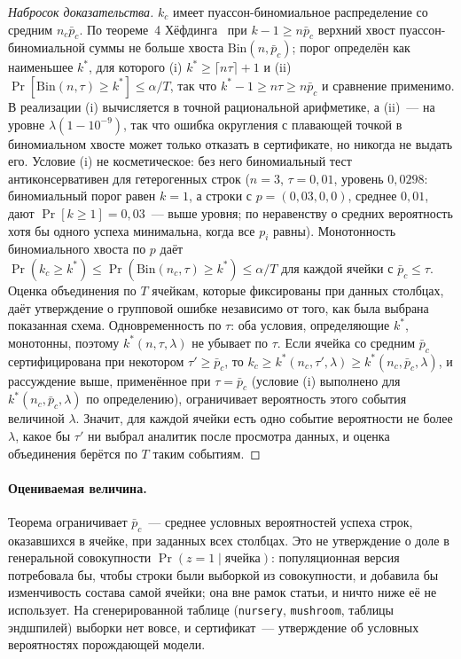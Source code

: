 \documentclass[11pt]{article}
\begin{document}
\begin{proof}[Набросок доказательства]
$k_c$ имеет пуассон-биномиальное распределение со средним $n_c\bar p_c$. По теореме~4 Хёфдинга~\citep{hoeffding1956} при $k-1\ge n\bar p_c$ верхний хвост пуассон-биномиальной суммы не больше хвоста $\mathrm{Bin}(n,\bar p_c)$; порог определён как наименьшее $k^*$, для которого (i) $k^*\ge\lceil n\tau\rceil+1$ и (ii) $\Pr[\mathrm{Bin}(n,\tau)\ge k^*]\le\alpha/T$, так что $k^*-1\ge n\tau\ge n\bar p_c$ и сравнение применимо. В реализации (i) вычисляется в точной рациональной арифметике, а (ii)~--- на уровне $\lambda(1-10^{-9})$, так что ошибка округления с плавающей точкой в биномиальном хвосте может только отказать в сертификате, но никогда не выдать его. Условие (i) не косметическое: без него биномиальный тест антиконсервативен для гетерогенных строк ($n=3$, $\tau=0{,}01$, уровень $0{,}0298$: биномиальный порог равен $k=1$, а строки с $p=(0{,}03,0,0)$, среднее $0{,}01$, дают $\Pr[k\ge1]=0{,}03$~--- выше уровня; по неравенству о средних вероятность хотя бы одного успеха минимальна, когда все $p_i$ равны). Монотонность биномиального хвоста по $p$ даёт $\Pr(k_c\ge k^*)\le\Pr(\mathrm{Bin}(n_c,\tau)\ge k^*)\le\alpha/T$ для каждой ячейки с $\bar p_c\le\tau$. Оценка объединения по $T$ ячейкам, которые фиксированы при данных столбцах, даёт утверждение о групповой ошибке независимо от того, как была выбрана показанная схема. Одновременность по $\tau$: оба условия, определяющие $k^*$, монотонны, поэтому $k^*(n,\tau,\lambda)$ не убывает по $\tau$. Если ячейка со средним $\bar p_c$ сертифицирована при некотором $\tau'\ge\bar p_c$, то $k_c\ge k^*(n_c,\tau',\lambda)\ge k^*(n_c,\bar p_c,\lambda)$, и рассуждение выше, применённое при $\tau=\bar p_c$ (условие (i) выполнено для $k^*(n_c,\bar p_c,\lambda)$ по определению), ограничивает вероятность этого события величиной $\lambda$. Значит, для каждой ячейки есть одно событие вероятности не более $\lambda$, какое бы $\tau'$ ни выбрал аналитик после просмотра данных, и оценка объединения берётся по $T$ таким событиям.
\end{proof}

\paragraph{Оцениваемая величина.} Теорема ограничивает $\bar p_c$~--- среднее условных вероятностей успеха строк, оказавшихся в ячейке, при заданных всех столбцах. Это не утверждение о доле в генеральной совокупности $\Pr(z=1\mid\text{ячейка})$: популяционная версия потребовала бы, чтобы строки были выборкой из совокупности, и добавила бы изменчивость состава самой ячейки; она вне рамок статьи, и ничто ниже её не использует. На сгенерированной таблице (\texttt{nursery}, \texttt{mushroom}, таблицы эндшпилей) выборки нет вовсе, и сертификат~--- утверждение об условных вероятностях порождающей модели.
\end{document}
